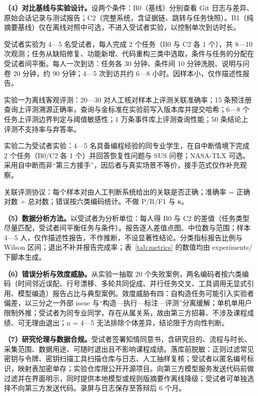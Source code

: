 \textbf{（4）对比基线与实验设计。}设两个条件：B0（基线）分别查看 Git 日志与差异、原始会话记录与测试报告；C2（完整系统，含证据链、跳转与任务快照）。B1（纯摘要基线）仅在离线对照中可选，不进入受试者实验，以控制单次到访时长。

受试者实验为 4—5 名受试者，每人完成 2 个任务（B0 与 C2 各 1 个），共 8—10 次观测；任务从缺陷修复、功能新增、代码重构三类中选取，条件与任务的分配在受试者间平衡。每人一次到访：任务各 30 分钟、条件间 10 分钟洗脱、说明与问卷 20 分钟，约 90 分钟；4—5 次到访共约 6—8 小时。因样本小，仅作描述性报告。

实验一为离线客观评测：20—30 对人工核对样本上评测关联准确率；15 条预注册查询上评测溯源正确率，查询与金标准在实验前写入版本库并提交哈希；6—8 个任务上评测边界判定与阈值敏感性；1 万条事件库上评测查询性能；50 条结论上评测不支持率与弃答率。

实验二为受试者实验：4—5 名具备编程经验的同专业学生，在自中断情境下完成 2 个任务（B0/C2 各 1 个）并回答恢复性问题与 SUS 问卷；NASA-TLX 可选。采用自中断而非“第三方接手”，因后者与真实场景不等价，接手范式仅作补充观察。

关联评测协议：每个样本对由人工判断系统给出的关联是否正确；准确率 = 正确对数 ÷ 总对数；错误按六类编码统计。不做 P/R/F1 与 κ。

\textbf{（5）数据分析方法。}以受试者为分析单位：每人得 B0 与 C2 的差值（任务类型尽量匹配，受试者间平衡任务与条件）。报告逐人差值点图、中位数与范围；样本 4—5 人，仅作描述性报告，不作推断，不设显著性结论。分类指标报告比例与 Wilson 区间；退出不补并报告完成率；表~\ref{tab:metrics} 的数值均由 experiments/ 下脚本生成。

\textbf{（6）错误分析与效度威胁。}从实验一抽取 20 个失败案例，两名编码者按六类编码（时间邻近误配、行号漂移、多轮共同促成、并行任务交叉、工具调用无显式引用、模型编造）报告占比与典型案例。效度威胁有四：自构造任务可能引入实验者偏差，以三分之一外部 issue 与“构造—执行—标注—评测”分离缓解；单机单用户限制外推；受试者为同专业同学，存在从属关系，故由第三方招募、不涉及课程成绩、可无理由退出；n = 4—5 无法排除个体差异，结论限于方向性判断。

\textbf{（7）研究伦理与数据合规。}受试者签署知情同意书，含研究目的、流程与时长、采集范围、数据用途、可随时退出且不影响课程成绩。落库前脱敏：正则过滤常见密钥与令牌、密钥扫描工具扫描仓库与日志、人工抽样复核；受试者以匿名编号标识，映射表加密单存；实验仓库限公开开源项目。向第三方模型服务发送代码前做过滤并在界面明示，同时提供本地模型或规则版摘要作离线降级；受试者可单独选择不向第三方发送代码。录屏与日志保存至答辩后 6 个月。


